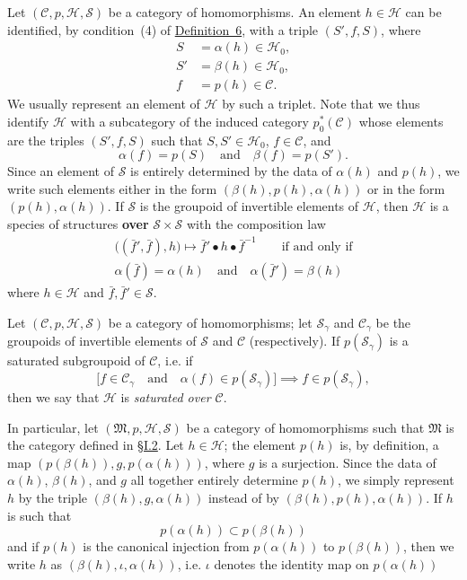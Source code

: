 \documentclass[a4paper,oneside,nobib,nofonts,notitlepage,notoc,nols,fleqn,justified]{tufte-book}
\newcommand{\unsure}[1]{{\color{purple}\textbf{#1}}}
\newcommand{\CC}{\mathcal{C}}
\newcommand{\HH}{\mathcal{H}}
\renewcommand{\SS}{\mathcal{S}}
\newcommand{\MM}{\mathfrak{M}}
\begin{document}
Let $(\CC,p,\HH,\SS)$ be a category of homomorphisms.
An element $h\in\HH$ can be identified, by condition~(4) of \hyperref[definition:6]{Definition~6}, with a triple $(S',f,S)$, where
\[
  \begin{aligned}
    S
    &= \alpha(h) \in\HH_0,
  \\S'
    &= \beta(h) \in\HH_0,
  \\f
    &= p(h)\in\CC.
  \end{aligned}
\]
We usually represent an element of $\HH$ by such a triplet.
Note that we thus identify $\HH$ with a subcategory of the induced category $p_0^*(\CC)$ whose elements are the triples $(S',f,S)$ such that $S,S'\in\HH_0$, $f\in\CC$, and
\[
  \alpha(f)=p(S)
  \quad\text{and}\quad
  \beta(f)=p(S').
\]
Since an element of $\SS$ is entirely determined by the data of $\alpha(h)$ and $p(h)$, we write such elements either in the form $(\beta(h),p(h),\alpha(h))$ or in the form $(p(h),\alpha(h))$.
If $\SS$ is the groupoid of invertible elements of $\HH$, then $\HH$ is a species of structures \unsure{over} $\SS\times\SS$ with the composition law
\[
  \begin{gathered}
    \big((\bar{f}',\bar{f}),h\big)
    \longmapsto\bar{f}'\bullet h\bullet\bar{f}^{-1}
    \qquad\text{if and only if}
  \\\alpha(\bar{f})=\alpha(h)
    \quad\text{and}\quad
    \alpha(\bar{f}')=\beta(h)
  \end{gathered}
\]
where $h\in\HH$ and $\bar{f},\bar{f}'\in\SS$.

Let $(\CC,p,\HH,\SS)$ be a category of homomorphisms;
let $\SS_\gamma$ and $\CC_\gamma$ be the groupoids of invertible elements of $\SS$ and $\CC$ (respectively).
If $p(\SS_\gamma)$ is a saturated \cite{3a} subgroupoid of $\CC$, i.e. if
\[
  \big[f\in\CC_\gamma
  \quad\text{and}\quad
  \alpha(f)\in p(\SS_\gamma)\big]
  \implies
  f\in p(\SS_\gamma),
\]
then we say that $\HH$ is \emph{saturated over $\CC$}.

In particular, let $(\MM,p,\HH,\SS)$ be a category of homomorphisms such that $\MM$ is the category defined in \hyperref[section:i.2]{§I.2}.
Let $h\in\HH$;
the element $p(h)$ is, by definition, a map $(p(\beta(h)),g,p(\alpha(h)))$, where $g$ is a surjection.
Since the data of $\alpha(h)$, $\beta(h)$, and $g$ all together entirely determine $p(h)$, we simply represent $h$ by the triple $(\beta(h),g,\alpha(h))$ instead of by $(\beta(h),p(h),\alpha(h))$.
If $h$ is such that
\[
  p(\alpha(h))
  \subset p(\beta(h))
\]
and if $p(h)$ is the canonical injection from $p(\alpha(h))$ to $p(\beta(h))$, then we write $h$ as $(\beta(h),\iota,\alpha(h))$, i.e. $\iota$ denotes the identity map on $p(\alpha(h))$
\end{document}
